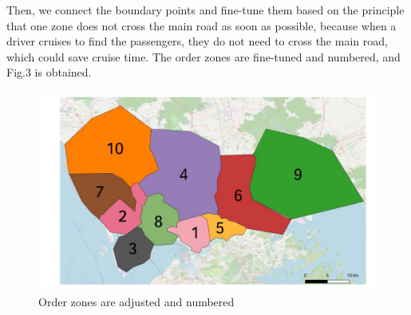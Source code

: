 \documentclass[sigconf]{acmart}
\begin{document}
Then, we connect the boundary points and fine-tune them based on the principle that one zone does not cross the main road as soon as possible, because when a driver cruises to find the passengers, they do not need to cross the main road, which could save cruise time. The order zones are fine-tuned and numbered, and Fig.3 is obtained.
\begin{figure}[h]
  \centering
  \includegraphics[width=1\linewidth]{figure3}
  \caption{Order zones are adjusted and numbered}
\end{figure}
\end{document}
